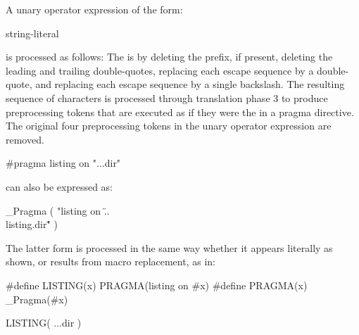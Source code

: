 \pnum
A unary operator expression of the form:
\begin{ncbnf}
 \terminal{(} string-literal \terminal{)}
\end{ncbnf}
is processed as follows: The  is 
by deleting the  prefix, if present, deleting the leading and trailing
double-quotes, replacing each escape sequence  by a double-quote, and
replacing each escape sequence \tcode{\textbackslash\textbackslash} by a single
backslash. The resulting sequence of characters is processed through translation phase 3
to produce preprocessing tokens that are executed as if they were the
 in a pragma directive. The original four preprocessing
tokens in the unary operator expression are removed.

\pnum
\begin{example}
\begin{codeblock}
#pragma listing on "..\listing.dir"
\end{codeblock}
can also be expressed as:
\begin{codeblock}
_Pragma ( "listing on \"..\\listing.dir\"" )
\end{codeblock}
The latter form is processed in the same way whether it appears literally
as shown, or results from macro replacement, as in:
\begin{codeblock}
#define LISTING(x) PRAGMA(listing on #x)
#define PRAGMA(x) _Pragma(#x)

LISTING( ..\listing.dir )
\end{codeblock}
\end{example}
